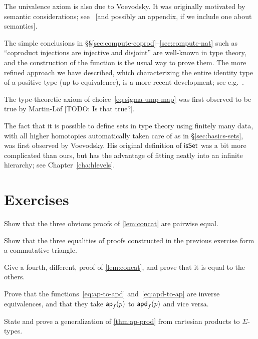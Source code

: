 The univalence axiom is also due to Voevodsky.
It was originally motivated by semantic considerations; see~\cite{klv:ssetmodel} [and possibly an appendix, if we include one about semantics].

The simple conclusions in \S\S\ref{sec:compute-coprod}--\ref{sec:compute-nat} such as ``coproduct injections are injective and disjoint'' are well-known in type theory, and the construction of the function \encode is the usual way to prove them.
The more refined approach we have described, which characterizing the entire identity type of a positive type (up to equivalence), is a more recent development; see e.g.~\cite{ls:pi1s1}.

The type-theoretic axiom of choice~\eqref{eq:sigma-ump-map} was first observed to be true by Martin-L\"of [TODO: Is that true?].

The fact that it is possible to define sets in type theory using finitely many data, with all higher homotopies automatically taken care of as in \S\ref{sec:basics-sets}, was first observed by Voevodsky.
His original definition of $\mathsf{isSet}$ was a bit more complicated than ours, but has the advantage of fitting neatly into an infinite hierarchy; see Chapter~\ref{cha:hlevels}.


\section*{Exercises}
\label{basics:exercises}

\begin{ex}\label{ex:basics:concat}
  Show that the three obvious proofs of \autoref{lem:concat} are pairwise equal.
\end{ex}

\begin{ex}
  Show that the three equalities of proofs constructed in the previous exercise form a commutative triangle.
\end{ex}

\begin{ex}
  Give a fourth, different, proof of \autoref{lem:concat}, and prove that it is equal to the others.
\end{ex}

\begin{ex}
  Prove that the functions~\eqref{eq:ap-to-apd} and~\eqref{eq:apd-to-ap} are inverse equivalences, and that they take $\mathsf{ap}_{f}(p)$ to $\mathsf{apd}_{f} (p)$ and vice versa.
\end{ex}

\begin{ex}\label{ex:ap-sigma}
  State and prove a generalization of \autoref{thm:ap-prod} from cartesian products to $\Sigma$-types.
\end{ex}

